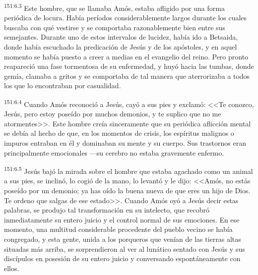 \par 
\textsuperscript{151:6.3} Este hombre, que se llamaba Amós, estaba afligido por una forma periódica de locura. Había períodos considerablemente largos durante los cuales buscaba con qué vestirse y se comportaba razonablemente bien entre sus semejantes. Durante uno de estos intervalos de lucidez, había ido a Betsaida, donde había escuchado la predicación de Jesús y de los apóstoles, y en aquel momento se había puesto a creer a medias en el evangelio del reino. Pero pronto reapareció una fase tormentosa de su enfermedad, y huyó hacia las tumbas, donde gemía, clamaba a gritos y se comportaba de tal manera que aterrorizaba a todos los que lo encontraban por casualidad.

\par 
\textsuperscript{151:6.4} Cuando Amós reconoció a Jesús, cayó a sus pies y exclamó: <<Te conozco, Jesús, pero estoy poseído por muchos demonios, y te suplico que no me atormentes>>. Este hombre creía sinceramente que su periódica aflicción mental se debía al hecho de que, en los momentos de crisis, los espíritus malignos o impuros entraban en él y dominaban su mente y su cuerpo. Sus trastornos eran principalmente emocionales ---su cerebro no estaba gravemente enfermo.

\par 
\textsuperscript{151:6.5} Jesús bajó la mirada sobre el hombre que estaba agachado como un animal a sus pies, se inclinó, lo cogió de la mano, lo levantó y le dijo: <<Amós, no estás poseído por un demonio; ya has oído la buena nueva de que eres un hijo de Dios. Te ordeno que salgas de ese estado>>. Cuando Amós oyó a Jesús decir estas palabras, se produjo tal transformación en su intelecto, que recobró inmediatamente su entero juicio y el control normal de sus emociones. En ese momento, una multitud considerable procedente del pueblo vecino se había congregado, y esta gente, unida a los porqueros que venían de las tierras altas situadas más arriba, se sorprendieron al ver al lunático sentado con Jesús y sus discípulos en posesión de su entero juicio y conversando espontáneamente con ellos.

